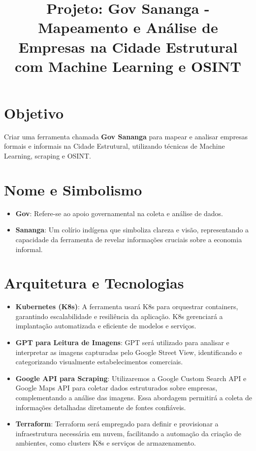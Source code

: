 \documentclass{article}
\title{Projeto: Gov Sananga - Mapeamento e Análise de Empresas na Cidade Estrutural com Machine Learning e OSINT}
\author{}
\date{}
\begin{document}
\maketitle

\section*{Objetivo}

Criar uma ferramenta chamada \textbf{Gov Sananga} para mapear e analisar empresas formais e informais na Cidade Estrutural, utilizando técnicas de Machine Learning, scraping e OSINT.

\section*{Nome e Simbolismo}

\begin{itemize}
    \item \textbf{Gov}: Refere-se ao apoio governamental na coleta e análise de dados.
    \item \textbf{Sananga}: Um colírio indígena que simboliza clareza e visão, representando a capacidade da ferramenta de revelar informações cruciais sobre a economia informal.
\end{itemize}

\section*{Arquitetura e Tecnologias}

\begin{itemize}
    \item \textbf{Kubernetes (K8s)}: A ferramenta usará K8s para orquestrar containers, garantindo escalabilidade e resiliência da aplicação. K8s gerenciará a implantação automatizada e eficiente de modelos e serviços.
    \item \textbf{GPT para Leitura de Imagens}: GPT será utilizado para analisar e interpretar as imagens capturadas pelo Google Street View, identificando e categorizando visualmente estabelecimentos comerciais.
    \item \textbf{Google API para Scraping}: Utilizaremos a Google Custom Search API e Google Maps API para coletar dados estruturados sobre empresas, complementando a análise das imagens. Essa abordagem permitirá a coleta de informações detalhadas diretamente de fontes confiáveis.
    \item \textbf{Terraform}: Terraform será empregado para definir e provisionar a infraestrutura necessária em nuvem, facilitando a automação da criação de ambientes, como clusters K8s e serviços de armazenamento.
\end{itemize}
\end{document}
